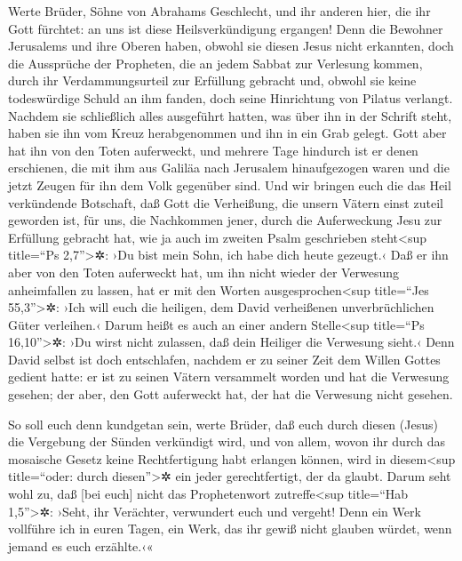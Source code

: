  Werte Brüder, Söhne von Abrahams Geschlecht, und ihr
anderen hier, die ihr Gott fürchtet: an uns ist diese Heilsverkündigung
ergangen!  Denn die Bewohner Jerusalems und ihre Oberen
haben, obwohl sie diesen Jesus nicht erkannten, doch die Aussprüche der
Propheten, die an jedem Sabbat zur Verlesung kommen, durch ihr
Verdammungsurteil zur Erfüllung gebracht  und, obwohl sie
keine todeswürdige Schuld an ihm fanden, doch seine Hinrichtung von
Pilatus verlangt.  Nachdem sie schließlich alles
ausgeführt hatten, was über ihn in der Schrift steht, haben sie ihn vom
Kreuz herabgenommen und ihn in ein Grab gelegt.  Gott
aber hat ihn von den Toten auferweckt,  und mehrere Tage
hindurch ist er denen erschienen, die mit ihm aus Galiläa nach Jerusalem
hinaufgezogen waren und die jetzt Zeugen für ihn dem Volk gegenüber
sind.  Und wir bringen euch die das Heil verkündende
Botschaft, daß Gott die Verheißung, die unsern Vätern einst zuteil
geworden ist,  für uns, die Nachkommen jener, durch die
Auferweckung Jesu zur Erfüllung gebracht hat, wie ja auch im zweiten
Psalm geschrieben steht\textless sup title=``Ps 2,7''\textgreater✲: ›Du
bist mein Sohn, ich habe dich heute gezeugt.‹  Daß er ihn
aber von den Toten auferweckt hat, um ihn nicht wieder der Verwesung
anheimfallen zu lassen, hat er mit den Worten ausgesprochen\textless sup
title=``Jes 55,3''\textgreater✲: ›Ich will euch die heiligen, dem David
verheißenen unverbrüchlichen Güter verleihen.‹  Darum
heißt es auch an einer andern Stelle\textless sup title=``Ps
16,10''\textgreater✲: ›Du wirst nicht zulassen, daß dein Heiliger die
Verwesung sieht.‹  Denn David selbst ist doch
entschlafen, nachdem er zu seiner Zeit dem Willen Gottes gedient hatte:
er ist zu seinen Vätern versammelt worden und hat die Verwesung gesehen;
 der aber, den Gott auferweckt hat, der hat die Verwesung
nicht gesehen.

 So soll euch denn kundgetan sein, werte Brüder, daß euch
durch diesen (Jesus) die Vergebung der Sünden verkündigt wird,
 und von allem, wovon ihr durch das mosaische Gesetz
keine Rechtfertigung habt erlangen können, wird in diesem\textless sup
title=``oder: durch diesen''\textgreater✲ ein jeder gerechtfertigt, der
da glaubt.  Darum seht wohl zu, daß {[}bei euch{]} nicht
das Prophetenwort zutreffe\textless sup title=``Hab 1,5''\textgreater✲:
 ›Seht, ihr Verächter, verwundert euch und vergeht! Denn
ein Werk vollführe ich in euren Tagen, ein Werk, das ihr gewiß nicht
glauben würdet, wenn jemand es euch erzählte.‹«

